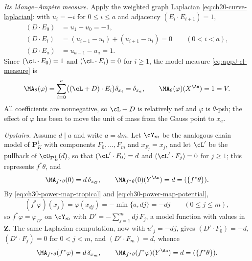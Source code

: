 \begin{example}
\emph{Its Monge--Amp\`ere measure.}  Apply the weighted graph Laplacian
\eqref{eq:ch20-curve-laplacian}: with \(u_i=-i\) for \(0\leq i\leq a\) and
adjacency \((E_i\cdot E_{i+1})=1\),
\[
\begin{aligned}
 (D\cdot E_0)&=u_1-u_0=-1,\\
 (D\cdot E_i)&=(u_{i-1}-u_i)+(u_{i+1}-u_i)=0\qquad(0<i<a),\\
 (D\cdot E_a)&=u_{a-1}-u_a=1 .
\end{aligned}
\]
Since \((\cL\cdot E_0)=1\) and \((\cL\cdot E_i)=0\) for \(i\geq1\), the
model measure \eqref{eq:appJ-cl-measure} is
\begin{equation}
\label{eq:ch30-power-map-ma-down}
 \MA_\theta(\varphi)
 =\sum_{i=0}^a\bigl((\cL+D)\cdot E_i\bigr)\delta_{x_i}
 =\delta_{x_a},
 \qquad
 \MA_\theta(\varphi)(X^{\An})=1=V .
\end{equation}
All coefficients are nonnegative, so \(\cL+D\) is relatively nef and
\(\varphi\) is \(\theta\)-psh; the effect of \(\varphi\) has been to move
the unit of mass from the Gauss point to \(x_a\).

\emph{Upstairs.}  Assume \(d\mid a\) and write \(a=dm\).  Let \(\cY_m\) be
the analogous chain model of \(\mathbf P^1_K\) with components
\(F_0,\ldots,F_m\) and \(x_{F_j}=x_j\), and let \(\cL'\) be the pullback of
\(\cO_{\mathbf P^1_R}(d)\), so that \((\cL'\cdot F_0)=d\) and
\((\cL'\cdot F_j)=0\) for \(j\geq1\); this represents \(f^*\theta\), and
\begin{equation}
\label{eq:ch30-power-map-ma-ref}
 \MA_{f^*\theta}(0)=d\,\delta_{x_G},
 \qquad
 \MA_{f^*\theta}(0)(Y^{\An})=d=(\{f^*\theta\}) .
\end{equation}
By \eqref{eq:ch30-power-map-tropical} and
\eqref{eq:ch30-power-map-potential},
\[
 (f^*\varphi)(x_j)=\varphi(x_{dj})=-\min\{a,dj\}=-dj
 \qquad (0\leq j\leq m),
\]
so \(f^*\varphi=\varphi_{D'}\) on \(\cY_m\) with
\(D'=-\sum_{j=1}^m dj\,F_j\), a model function with values in
\(\mathbf Z\).  The same Laplacian computation, now with \(u'_j=-dj\), gives
\((D'\cdot F_0)=-d\), \((D'\cdot F_j)=0\) for \(0<j<m\), and
\((D'\cdot F_m)=d\), whence
\begin{equation}
\label{eq:ch30-power-map-ma-up}
 \MA_{f^*\theta}(f^*\varphi)=d\,\delta_{x_m},
 \qquad
 \MA_{f^*\theta}(f^*\varphi)(Y^{\An})=d=(\{f^*\theta\}) .
\end{equation}


\end{example}
